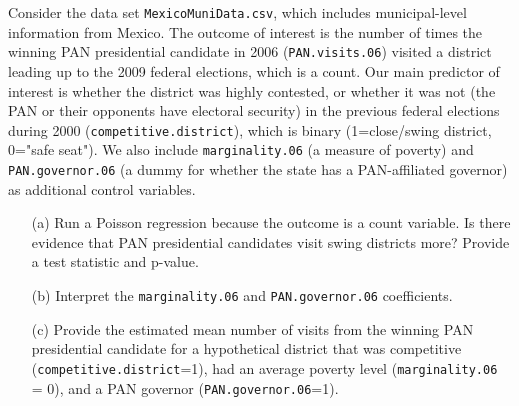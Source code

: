 \documentclass[12pt,letterpaper]{article}
\begin{document}
\noindent Consider the data set \texttt{MexicoMuniData.csv}, which includes municipal-level information from Mexico. The outcome of interest is the number of times the winning PAN presidential candidate in 2006 (\texttt{PAN.visits.06}) visited a district leading up to the 2009 federal elections, which is a count. Our main predictor of interest is whether the district was highly contested, or whether it was not (the PAN or their opponents have electoral security) in the previous federal elections during 2000 (\texttt{competitive.district}), which is binary (1=close/swing district, 0="safe seat"). We also include \texttt{marginality.06} (a measure of poverty) and \texttt{PAN.governor.06} (a dummy for whether the state has a PAN-affiliated governor) as additional control variables. 

\begin{enumerate}
	\item [(a)]
	Run a Poisson regression because the outcome is a count variable. Is there evidence that PAN presidential candidates visit swing districts more? Provide a test statistic and p-value.

	\item [(b)]
	Interpret the \texttt{marginality.06} and \texttt{PAN.governor.06} coefficients.
	
	\item [(c)]
	Provide the estimated mean number of visits from the winning PAN presidential candidate for a hypothetical district that was competitive (\texttt{competitive.district}=1), had an average poverty level (\texttt{marginality.06} = 0), and a PAN governor (\texttt{PAN.governor.06}=1).
	
\end{enumerate}
\end{document}
